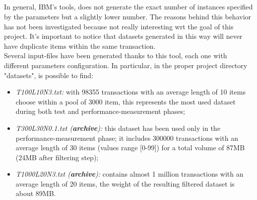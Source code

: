 \documentclass[]{report}
\begin{document}
	\\\\\\
	\begin{figure}[h]
		\centering
		\hspace{1cm}
		\hspace{1mm}
		\hspace{1mm} 
	\end{figure}
	\vspace{-1.0cm}\\
	In general, IBM's tools, does not generate the exact number of instances specified by the parameters but a slightly lower number. The reasons behind this behavior has not been investigated because not really interesting wrt the goal of this project. It's important to notice that datasets generated in this way will never have duplicate items within the same transaction. \\   
	Several input-files have been generated thanks to this tool, each one with different parameters configuration. In particular, in the proper project directory "datasets", is possible to find:
	\begin{itemize}	 
		\item \textit{T100L10N3.txt:} with 98355 transactions with an average length of 10 items choose within a pool of 3000 item, this represents the most used dataset during both test and performance-measurement phases;
		\item \textit{T300L30N0.1.txt (\textbf{archive}):} this dataset has been used only in the performance-measurement phase; it includes 300000 transactions with an average length of 30 items (values range [0-99]) for a total volume of 87MB (24MB after filtering step); 
		\item \textit{T1000L20N3.txt (\textbf{archive}):} contains almost 1 million transactions with an average length of 20 items, the weight of the resulting filtered dataset is about 89MB.
	\end{itemize}
\end{document}
